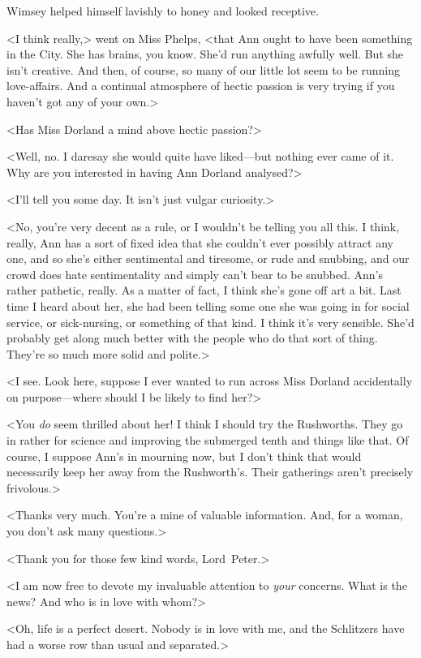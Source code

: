 Wimsey helped himself lavishly to honey and looked receptive.

<I think really,> went on Miss Phelps, <that Ann ought to have been something in the City. She has brains, you know. She'd run anything awfully well. But she isn't creative. And then, of course, so many of our little lot seem to be running love-affairs. And a continual atmosphere of hectic passion is very trying if you haven't got any of your own.>

<Has Miss Dorland a mind above hectic passion?>

<Well, no. I daresay she would quite have liked—but nothing ever came of it. Why are you interested in having Ann Dorland analysed?>

<I'll tell you some day. It isn't just vulgar curiosity.>

<No, you're very decent as a rule, or I wouldn't be telling you all this. I think, really, Ann has a sort of fixed idea that she couldn't ever possibly attract any one, and so she's either sentimental and tiresome, or rude and snubbing, and our crowd does hate sentimentality and simply can't bear to be snubbed. Ann's rather pathetic, really. As a matter of fact, I think she's gone off art a bit. Last time I heard about her, she had been telling some one she was going in for social service, or sick-nursing, or something of that kind. I think it's very sensible. She'd probably get along much better with the people who do that sort of thing. They're so much more solid and polite.>

<I see. Look here, suppose I ever wanted to run across Miss Dorland accidentally on purpose—where should I be likely to find her?>

<You \emph{do} seem thrilled about her! I think I should try the Rushworths. They go in rather for science and improving the submerged tenth and things like that. Of course, I suppose Ann's in mourning now, but I don't think that would necessarily keep her away from the Rushworth's. Their gatherings aren't precisely frivolous.>

<Thanks very much. You're a mine of valuable information. And, for a woman, you don't ask many questions.>

<Thank you for those few kind words, Lord~Peter.>

<I am now free to devote my invaluable attention to \emph{your} concerns. What is the news? And who is in love with whom?>

<Oh, life is a perfect desert. Nobody is in love with me, and the Schlitzers have had a worse row than usual and separated.>

